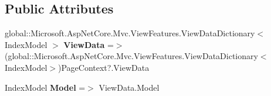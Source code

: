 \subsection*{Public Attributes}
\begin{DoxyCompactItemize}
\item 
\mbox{\label{class_projeto_e_s_w_1_1_areas_1_1_identity_1_1_pages_1_1_account_1_1_manage_1_1_areas___identity605f2cac3dc5a4ea38af9197eadd5652_a84fcc04dde00f55a431010fd3454f0ff}} 
global\+::\+Microsoft.\+Asp\+Net\+Core.\+Mvc.\+View\+Features.\+View\+Data\+Dictionary$<$ Index\+Model $>$ {\bfseries View\+Data} =$>$ (global\+::\+Microsoft.\+Asp\+Net\+Core.\+Mvc.\+View\+Features.\+View\+Data\+Dictionary$<$Index\+Model$>$)Page\+Context?.View\+Data
\item 
\mbox{\label{class_projeto_e_s_w_1_1_areas_1_1_identity_1_1_pages_1_1_account_1_1_manage_1_1_areas___identity605f2cac3dc5a4ea38af9197eadd5652_a1cde544f3e4a8254ce6ddcafc2bf48d9}} 
Index\+Model {\bfseries Model} =$>$ View\+Data.\+Model
\end{DoxyCompactItemize}
